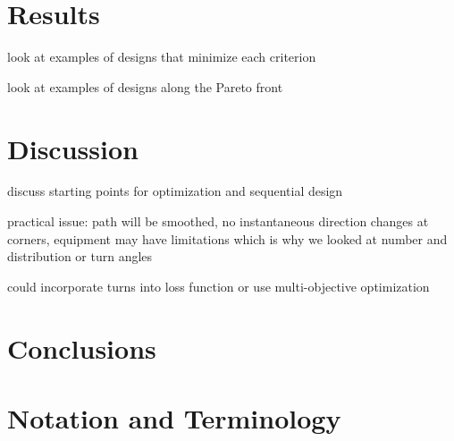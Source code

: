 \documentclass[review]{elsarticle}
\begin{document}
\section{Results}

look at examples of designs that minimize each criterion

look at examples of designs along the Pareto front


\section{Discussion}

discuss starting points for optimization and sequential design

practical issue: path will be smoothed, no instantaneous direction changes at
corners, equipment may have limitations which is why we looked at number and
distribution or turn angles

could incorporate turns into loss function or use multi-objective
optimization~\citep{lark}


\section{Conclusions}


\appendix
\section{Notation and Terminology}
\end{document}
